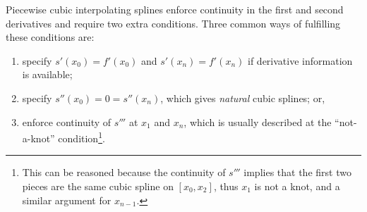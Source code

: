 \begin{example}
Piecewise cubic interpolating splines enforce continuity in the first and second derivatives and require two extra conditions. Three common ways of fulfilling these conditions are:
\begin{enumerate}
\item specify $s'(x_0)=f'(x_0)$ and $s'(x_n) = f'(x_n)$ if derivative information is available;
\item specify $s''(x_0) = 0 = s''(x_n)$, which gives {\em natural} cubic splines; or,
\item enforce continuity of $s'''$ at $x_1$ and $x_n$, which is usually described at the ``not-a-knot'' condition\footnote{This can be reasoned because the continuity of $s'''$ implies that the first two pieces are the same cubic spline on $[x_0,x_2]$, thus $x_1$ is not a knot, and a similar argument for $x_{n-1}$.}.
\end{enumerate}
\end{example}

